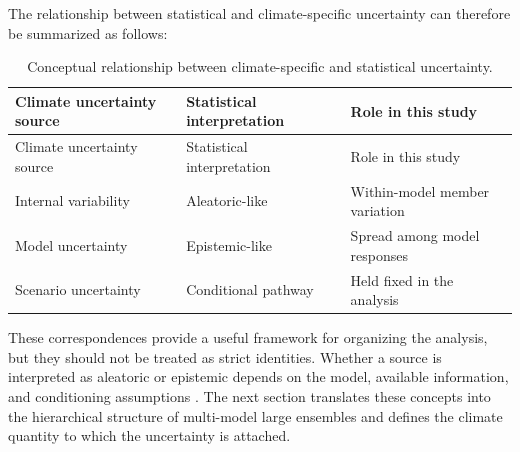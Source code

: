 \documentclass[
]{krantz}
\begin{document}
The relationship between statistical and climate-specific uncertainty can therefore be summarized as follows:

\begin{longtable}[]{@{}
  >{\raggedright\arraybackslash}p{}
  >{\raggedright\arraybackslash}p{}
  >{\raggedright\arraybackslash}p{}@{}}
\caption{\label{tab:unc-uncertainty-category} Conceptual relationship between climate-specific and statistical uncertainty.}\tabularnewline
\toprule\noalign{}
\begin{minipage}[b]{\linewidth}\raggedright
Climate uncertainty source
\end{minipage} & \begin{minipage}[b]{\linewidth}\raggedright
Statistical interpretation
\end{minipage} & \begin{minipage}[b]{\linewidth}\raggedright
Role in this study
\end{minipage} \\
\midrule\noalign{}
\endfirsthead
\toprule\noalign{}
\begin{minipage}[b]{\linewidth}\raggedright
Climate uncertainty source
\end{minipage} & \begin{minipage}[b]{\linewidth}\raggedright
Statistical interpretation
\end{minipage} & \begin{minipage}[b]{\linewidth}\raggedright
Role in this study
\end{minipage} \\
\midrule\noalign{}
\endhead
\bottomrule\noalign{}
\endlastfoot
Internal variability & Aleatoric-like & Within-model member variation \\
Model uncertainty & Epistemic-like & Spread among model responses \\
Scenario uncertainty & Conditional pathway & Held fixed in the analysis \\
\end{longtable}

These correspondences provide a useful framework for organizing the analysis, but they should not be treated as strict identities. Whether a source is interpreted as aleatoric or epistemic depends on the model, available information, and conditioning assumptions \citep{Gruber2025}. The next section translates these concepts into the hierarchical structure of multi-model large ensembles and defines the climate quantity to which the uncertainty is attached.
\end{document}
